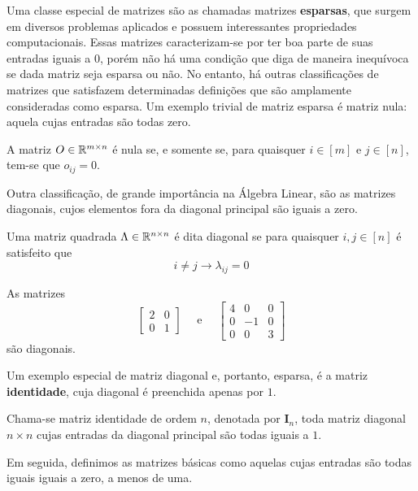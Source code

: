 Uma classe especial de matrizes são as chamadas matrizes \textbf{esparsas}, que surgem
em diversos problemas aplicados e possuem interessantes propriedades computacionais.
Essas matrizes caracterizam-se por ter boa parte de suas entradas iguais a $0$, porém
não há uma condição que diga de maneira inequívoca se dada matriz seja esparsa ou não.
No entanto, há outras classificações de matrizes que satisfazem determinadas definições que
são amplamente consideradas como esparsa.
Um exemplo trivial de matriz esparsa é matriz nula: aquela cujas entradas são todas zero.

\begin{def:matriz nula}
A matriz $O \in \mathbb{R}^{m \times n}$ é nula se, e somente se, para quaisquer $i \in [m]$
e $j \in [n]$, tem-se que $o_{ij} = 0$.
\end{def:matriz nula}

Outra classificação, de grande importância na Álgebra Linear, são as matrizes diagonais,
cujos elementos fora da diagonal principal são iguais a zero.

\begin{def:matriz diagonal}
Uma matriz quadrada $\Lambda \in \mathbb{R}^{n \times n}$ é dita diagonal se para quaisquer
$i, j \in [n]$ é satisfeito que
\[
	i \ne j \rightarrow \lambda_{ij} = 0
\]
\end{def:matriz diagonal}

\begin{exp:diagonal1}
As matrizes
\[
	\begin{bmatrix}
		2 & 0 \\
		0 & 1
	\end{bmatrix} \quad \text{ e } \quad
	\begin{bmatrix}
		4 & 0  & 0 \\
		0 & -1 & 0 \\
		0 & 0  & 3
	\end{bmatrix}
\]
são diagonais.
\end{exp:diagonal1}

Um exemplo especial de matriz diagonal e, portanto, esparsa, é a matriz \textbf{identidade},
cuja diagonal é preenchida apenas por $1$.

\begin{def:matriz identidade}
Chama-se matriz identidade de ordem $n$, denotada por $\mathbf I_n$, toda matriz diagonal
$n \times n$ cujas entradas da diagonal principal são todas iguais a $1$.
\end{def:matriz identidade}

Em seguida, definimos as matrizes básicas como aquelas cujas entradas são todas iguais
iguais a zero, a menos de uma.

